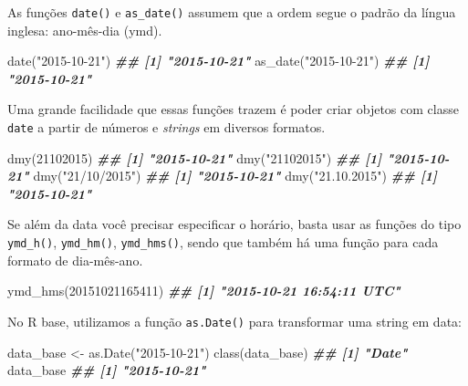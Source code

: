 \documentclass[
]{book}
\newenvironment{Shaded}{\begin{snugshade}}{\end{snugshade}}
\newcommand{\DecValTok}[1]{\textcolor[rgb]{0.00,0.00,0.81}{#1}}
\newcommand{\DocumentationTok}[1]{\textcolor[rgb]{0.56,0.35,0.01}{\textbf{\textit{#1}}}}
\newcommand{\FunctionTok}[1]{\textcolor[rgb]{0.00,0.00,0.00}{#1}}
\newcommand{\NormalTok}[1]{#1}
\newcommand{\OtherTok}[1]{\textcolor[rgb]{0.56,0.35,0.01}{#1}}
\newcommand{\StringTok}[1]{\textcolor[rgb]{0.31,0.60,0.02}{#1}}
\begin{document}
As funções \texttt{date()} e \texttt{as\_date()} assumem que a ordem segue o padrão da língua inglesa: ano-mês-dia (ymd).

\begin{Shaded}
\begin{Highlighting}[]
\FunctionTok{date}\NormalTok{(}\StringTok{"2015{-}10{-}21"}\NormalTok{)}
\DocumentationTok{\#\# [1] "2015{-}10{-}21"}
\FunctionTok{as\_date}\NormalTok{(}\StringTok{"2015{-}10{-}21"}\NormalTok{)}
\DocumentationTok{\#\# [1] "2015{-}10{-}21"}
\end{Highlighting}
\end{Shaded}

Uma grande facilidade que essas funções trazem é poder criar objetos com classe \texttt{date} a partir de números e \emph{strings} em diversos formatos.

\begin{Shaded}
\begin{Highlighting}[]
\FunctionTok{dmy}\NormalTok{(}\DecValTok{21102015}\NormalTok{)}
\DocumentationTok{\#\# [1] "2015{-}10{-}21"}
\FunctionTok{dmy}\NormalTok{(}\StringTok{"21102015"}\NormalTok{)}
\DocumentationTok{\#\# [1] "2015{-}10{-}21"}
\FunctionTok{dmy}\NormalTok{(}\StringTok{"21/10/2015"}\NormalTok{)}
\DocumentationTok{\#\# [1] "2015{-}10{-}21"}
\FunctionTok{dmy}\NormalTok{(}\StringTok{"21.10.2015"}\NormalTok{)}
\DocumentationTok{\#\# [1] "2015{-}10{-}21"}
\end{Highlighting}
\end{Shaded}

Se além da data você precisar especificar o horário, basta usar as funções do tipo \texttt{ymd\_h()}, \texttt{ymd\_hm()}, \texttt{ymd\_hms()}, sendo que também há uma função para cada formato de dia-mês-ano.

\begin{Shaded}
\begin{Highlighting}[]
\FunctionTok{ymd\_hms}\NormalTok{(}\DecValTok{20151021165411}\NormalTok{)}
\DocumentationTok{\#\# [1] "2015{-}10{-}21 16:54:11 UTC"}
\end{Highlighting}
\end{Shaded}

No R base, utilizamos a função \texttt{as.Date()} para transformar uma string em data:

\begin{Shaded}
\begin{Highlighting}[]
\NormalTok{data\_base }\OtherTok{\textless{}{-}} \FunctionTok{as.Date}\NormalTok{(}\StringTok{"2015{-}10{-}21"}\NormalTok{)}
\FunctionTok{class}\NormalTok{(data\_base)}
\DocumentationTok{\#\# [1] "Date"}
\NormalTok{data\_base}
\DocumentationTok{\#\# [1] "2015{-}10{-}21"}
\end{Highlighting}
\end{Shaded}
\end{document}
